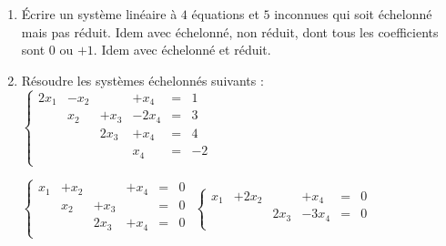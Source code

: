 \begin{frame}

\begin{miniexercice}
\begin{enumerate}
  \item \'Ecrire un système linéaire à $4$ équations et $5$ inconnues qui soit
  échelonné mais pas réduit. Idem avec échelonné, non réduit, dont tous les coefficients sont
  $0$ ou $+1$. Idem avec échelonné et réduit.
  
 \item Résoudre les systèmes échelonnés suivants :
$\left \{ \begin{array}{cccccc}
2x_1 & -x_2&      & +x_4 &=& 1 \\
    & x_2 & +x_3 &-2x_4 &=& 3 \\
    &     & 2x_3 & +x_4 &=& 4 \\
    &     &      & x_4  &=& -2 \\ 
\end{array} \right.$ 

$\left \{ \begin{array}{cccccc}
x_1 & +x_2&      & +x_4 &=& 0 \\
    & x_2 & +x_3 &     &=& 0 \\
    &     & 2x_3 & +x_4 &=& 0 \\
\end{array} \right.$ \qquad
$\left \{ \begin{array}{cccccc}
x_1 & +2x_2&      & +x_4   &=& 0 \\
    &     & 2x_3 & -3x_4 &=& 0 \\
\end{array} \right.$ 
\end{enumerate}
\end{miniexercice}
\end{frame}

